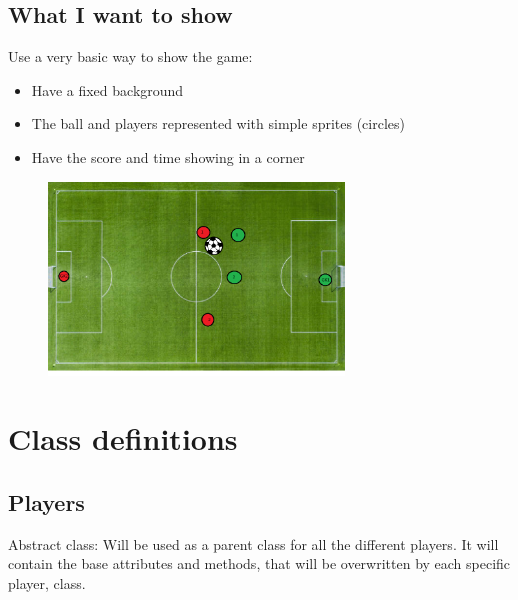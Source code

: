 \documentclass{article}
\theoremstyle{mytheoremstyle}
\theoremstyle{mytheoremstyle}
\theoremstyle{myproblemstyle}
\begin{document}
    \newpage
    \subsection{What I want to show}
    Use a very basic way to show the game:
    \begin{itemize}
        \item Have a fixed background
        \item The ball and players represented with simple sprites (circles)
        \item Have the score and time showing in a corner
    \end{itemize}

    \begin{figure}[h]
        \begin{center}
            \includegraphics[width=0.7\textwidth]{Images/prototype.png}        
        \end{center}
    \end{figure}
    
    \section{Class definitions}
    \subsection{Players}
    Abstract class: Will be used as a parent class for all the different players. It will contain the base attributes and methods, that will be overwritten by each specific player, class.
\end{document}
